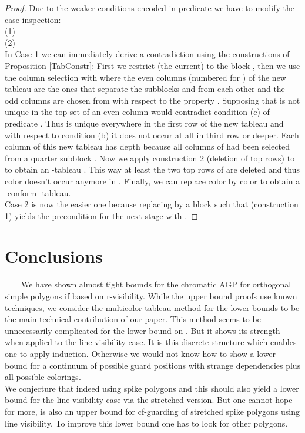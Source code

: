 \documentclass[a4paper,USenglish,numberwithinsect]{lipics}
\theoremstyle{plain}
\begin{document}
\begin{proof}
Due to the weaker conditions encoded in predicate  we have to modify the case inspection:\\
(1) \\
(2) \\
In Case 1 we can immediately derive a contradiction  using the
constructions of Proposition
\ref{TabConstr}: First we restrict (the current) 
to the block , then we use the column selection with 
where
the even columns (numbered  for ) of the new tableau are
the ones that separate the subblocks
 and  from each other and the odd columns 
are chosen from 
with respect to the property . Supposing that  
is not unique in the top set of
an even column would contradict condition (c) of
predicate .
Thus  is unique everywhere in the first row of the new tableau and
with respect to condition (b)
it does not occur at all in third row or deeper. Each column of this
new  tableau 
has depth  because all columns of  had been
selected from a quarter
subblock . Now we apply construction 2 (deletion of top rows)
to  to obtain an
-tableau .  This way at least the two top
rows of 
are deleted and thus color  doesn't occur anymore in .
Finally, we can  replace color  by  color  to obtain a
-conform
-tableau.
\\
Case 2 is now the easier one because replacing  by a block
 such that
 (construction 1) yields
the precondition for the next
stage with .
\end{proof}







\section{Conclusions}
\ \ \ \ We have shown almost tight bounds for the chromatic AGP for orthogonal 
simple polygons if based on r-visibility. While the upper bound proofs use known techniques, we consider the multicolor tableau method
 for the lower bounds to be the main technical contribution of our paper. This method seems to be unnecessarily complicated for the lower
 bound on . But it shows its strength when applied to the line visibility case. It is this discrete structure which enables
 one to apply induction. Otherwise we would not know how to show a lower bound for a continuum of possible  guard positions with strange dependencies 
plus all possible colorings.\\
We conjecture that indeed   using spike polygons and this should also yield a  lower bound for the line visibility case via the stretched version.
But one cannot hope for more,  is also an upper bound for cf-guarding of stretched spike polygons using line visibility. To improve this lower bound one has to look for other polygons. 
\end{document}
